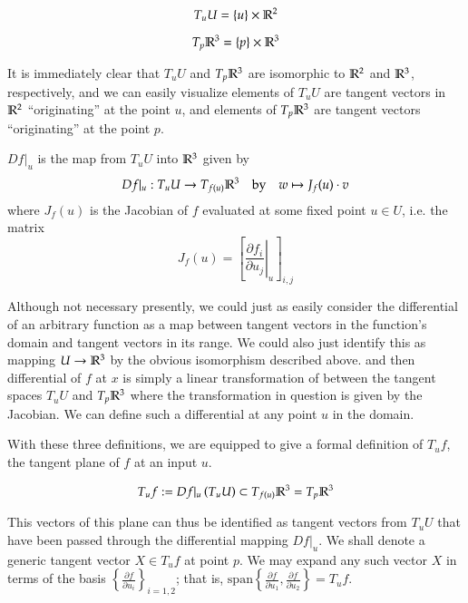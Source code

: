     
    \begin{defn} \label{def:tangent-at-U}
    	\[ T_{u} U = \left\{u\right\} \times \mathbb{R}^2
    	\]
    	\end{defn}
    \begin{defn}
    	\[ T_{p} \mathbb{R}^3 = \{p\} \times \mathbb{R}^3
    	\]
    \end{defn}
    It is immediately clear that $T_uU$ and $T_p\mathbb{R}^3$ are isomorphic to
    $\mathbb{R}^2$ and $\mathbb{R}^3$, respectively, and we can easily visualize elements of $T_uU$ are tangent vectors in $\mathbb{R}^2$ ``originating'' at the point $u$, and elements of $T_p\mathbb{R}^3$ are tangent vectors ``originating'' at the point $p$.
\begin{defn} \label{def:differential-map}
       	$Df\vert_u$ is the map from $T_uU$ into $\mathbb{R}^3$ given by
    \[
     Df|_u : T_uU \to T_{f(u)}\mathbb{R}^3
     \quad \textrm{by}
     \quad w \mapsto J_f (u) \cdot v
    \]
where $J_f(u)$ is the Jacobian of $f$ evaluated at some fixed point $u \in U$, i.e. the matrix
\[
J_f (u) = \left[ \left.\frac{\partial f_i}{\partial u_j}\right\vert_u \right]_{i,j}
\]
\end{defn} %
Although not necessary presently, we could just as easily consider the differential of an arbitrary function as a map between tangent vectors in the function's domain and tangent vectors in its range.
We could also just identify this as mapping  $U \to \mathbb{R}^3$ by the obvious isomorphism described above. and then differential of $f$ at $x$ is simply a linear transformation of between the tangent spaces $T_uU$ and $T_p\mathbb{R}^3$ where the transformation in question is given by the Jacobian. We can define such a differential at any point $u$ in the domain.

With these three definitions, we are equipped to give a formal definition of $T_uf$,
the tangent plane of $f$ at an input $u$.
\begin{defn}\label{def:tangent-plane}
\[
T_u f := Df\vert_u \left(T_u U\right)
\subset T_{f(u)} \mathbb{R}^3 = T_{p} \mathbb{R}^3
\]
\end{defn}

This vectors of this plane can thus be identified as tangent vectors from $T_uU$ that have been passed through the differential mapping $Df\vert_u$.
We shall denote a generic tangent vector $X \in T_u f$ at point $p$.
We may expand any such vector $X$ in terms of the basis $\left\{ \frac{\partial f}{\partial u_i}\right\}_{i=1,2}$; that is,
$\textrm{span}\left\{ \frac{\partial f}{\partial u_1}, \frac{\partial f}{\partial u_2}\right\} = T_u f$.

